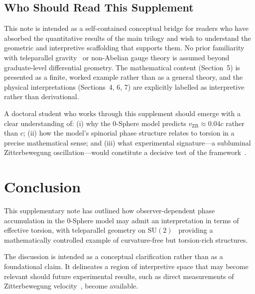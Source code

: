 \documentclass[12pt,letterpaper]{article}
\begin{document}
\subsection{Who Should Read This Supplement}

This note is intended as a self-contained conceptual bridge for readers who have absorbed the quantitative results of the main trilogy and wish to understand the geometric and interpretive scaffolding that supports them. No prior familiarity with teleparallel gravity~\cite{Aldrovandi2013} or non-Abelian gauge theory is assumed beyond graduate-level differential geometry. The mathematical content (Section~5) is presented as a finite, worked example rather than as a general theory, and the physical interpretations (Sections~4, 6, 7) are explicitly labelled as interpretive rather than derivational.

A doctoral student who works through this supplement should emerge with a clear understanding of: (i) why the 0-Sphere model predicts $v_{\mathrm{ZB}} \approx 0.04c$ rather than $c$; (ii) how the model's spinorial phase structure relates to torsion in a precise mathematical sense; and (iii) what experimental signature---a subluminal Zitterbewegung oscillation---would constitute a decisive test of the framework~\cite{hanamura18356895}.


\section{Conclusion}

\justifying
This supplementary note has outlined how observer-dependent phase accumulation in the 0-Sphere model may admit an interpretation in terms of effective torsion, with teleparallel geometry on $\mathrm{SU}(2)$~\cite{Weitzenbock1923,Aldrovandi2013} providing a mathematically controlled example of curvature-free but torsion-rich structures.

The discussion is intended as a conceptual clarification rather than as a foundational claim. It delineates a region of interpretive space that may become relevant should future experimental results, such as direct measurements of Zitterbewegung velocity~\cite{hanamura18356895}, become available.
\end{document}
